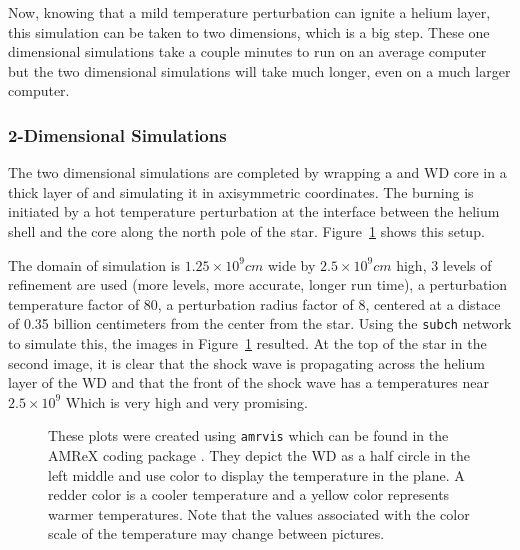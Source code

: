 \documentclass[preprint]{aastex62}
\begin{document}
      Now, knowing that a mild temperature perturbation can ignite a helium layer, this simulation can be taken to two dimensions, which is a big step. These one dimensional simulations take a couple minutes to run on an average computer but the two dimensional simulations will take much longer, even on a much larger computer. 
    
    
    \subsubsection{2-Dimensional Simulations}
  
      The two dimensional simulations are completed by wrapping a  and  WD core in a thick layer of  and simulating it in axisymmetric coordinates. The burning is initiated by a hot temperature perturbation at the interface between the helium shell and the core along the north pole of the star. Figure~\ref{fig:subchsims} shows this setup. 
      
      The domain of simulation is $1.25 \times 10^9 cm$ wide by $2.5 \times 10^9 cm$ high, 3 levels of refinement are used (more levels, more accurate, longer run time), a perturbation temperature factor of 80, a perturbation radius factor of 8, centered at a distace of 0.35 billion centimeters from the center from the star. Using the {\tt subch} network to simulate this, the images in Figure~\ref{fig:subchsims} resulted. At the top of the star in the second image, it is clear that the shock wave is propagating across the helium layer of the WD and that the front of the shock wave has a temperatures near $2.5 \times 10^9$ Which is very high and very promising. 
      
      \begin{figure}
        \caption{These plots were created using {\tt amrvis} which can be found in the AMReX coding package \citep{AMREXcodes}. They depict the WD as a half circle in the left middle and use color to display the temperature in the plane. A redder color is a cooler temperature and a yellow color represents warmer temperatures. Note that the values associated with the color scale of the temperature may change between pictures. 
          }
        \label{fig:subchsims}
      \end{figure}
      
\end{document}
